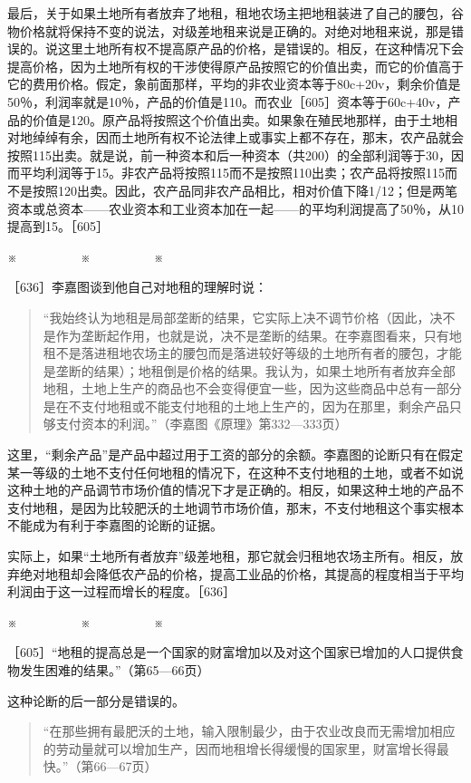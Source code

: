 最后，关于如果土地所有者放弃了地租，租地农场主把地租装进了自己的腰包，谷物价格就将保持不变的说法，对级差地租来说是正确的。对绝对地租来说，那是错误的。说这里土地所有权不提高原产品的价格，是错误的。相反，在这种情况下会提高价格，因为土地所有权的干涉使得原产品按照它的价值出卖，而它的价值高于它的费用价格。假定，象前面那样，平均的非农业资本等于80c+20v，剩余价值是50％，利润率就是10％，产品的价值是110。而农业［605］资本等于60c+40v，产品的价值是120。原产品将按照这个价值出卖。如果象在殖民地那样，由于土地相对地绰绰有余，因而土地所有权不论法律上或事实上都不存在，那末，农产品就会按照115出卖。就是说，前一种资本和后一种资本（共200）的全部利润等于30，因而平均利润等于15。非农产品将按照115而不是按照110出卖；农产品将按照115而不是按照120出卖。因此，农产品同非农产品相比，相对价值下降1/12；但是两笔资本或总资本——农业资本和工业资本加在一起——的平均利润提高了50％，从10提高到15。［605］

※　　　　　※　　　　　※

［636］李嘉图谈到他自己对地租的理解时说：

\begin{quote}{“我始终认为地租是局部垄断的结果，它实际上决不调节价格（因此，决不是作为垄断起作用，也就是说，决不是垄断的结果。在李嘉图看来，只有地租不是落进租地农场主的腰包而是落进较好等级的土地所有者的腰包，才能是垄断的结果）；地租倒是价格的结果。我认为，如果土地所有者放弃全部地租，土地上生产的商品也不会变得便宜一些，因为这些商品中总有一部分是在不支付地租或不能支付地租的土地上生产的，因为在那里，剩余产品只够支付资本的利润。”（李嘉图《原理》第332—333页）}\end{quote}

这里，“剩余产品”是产品中超过用于工资的部分的余额。李嘉图的论断只有在假定某一等级的土地不支付任何地租的情况下，在这种不支付地租的土地，或者不如说这种土地的产品调节市场价值的情况下才是正确的。相反，如果这种土地的产品不支付地租，是因为比较肥沃的土地调节市场价值，那末，不支付地租这个事实根本不能成为有利于李嘉图的论断的证据。

实际上，如果“土地所有者放弃”级差地租，那它就会归租地农场主所有。相反，放弃绝对地租却会降低农产品的价格，提高工业品的价格，其提高的程度相当于平均利润由于这一过程而增长的程度。［636］

※　　　　　※　　　　　※

［605］“地租的提高总是一个国家的财富增加以及对这个国家已增加的人口提供食物发生困难的结果。”（第65—66页）

这种论断的后一部分是错误的。

\begin{quote}{“在那些拥有最肥沃的土地，输入限制最少，由于农业改良而无需增加相应的劳动量就可以增加生产，因而地租增长得缓慢的国家里，财富增长得最快。”（第66—67页）}\end{quote}

